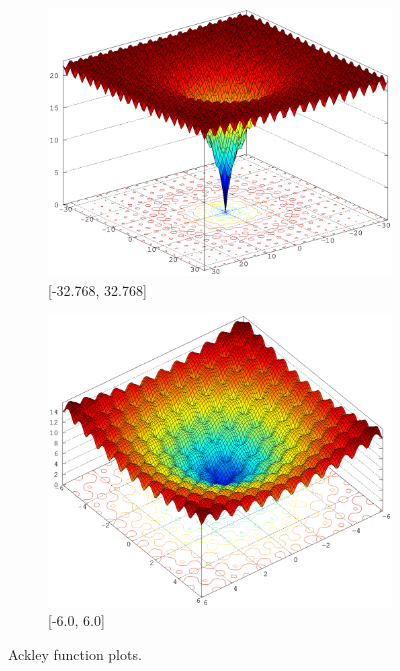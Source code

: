 \documentclass[12pt, a4paper]{article}
\begin{document}
		\begin{figure}[ht]
			\begin{subfigure}{0.49\textwidth}
				\includegraphics[width=\linewidth]{Images/Ackley_large}
				\caption{[-32.768, 32.768]}
			\end{subfigure}
			\begin{subfigure}{0.49\textwidth}
				\includegraphics[width=\linewidth]{Images/Ackley_small}
				\caption{[-6.0, 6.0]}
			\end{subfigure}
			\caption{Ackley function plots.}
		\end{figure}
\end{document}
